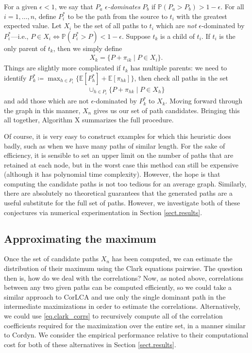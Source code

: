 \documentclass[12pt]{article}
\def\P{\mathbb{P}}
\def\E{\mathbb{E}}
\begin{document}
For a given $\epsilon < 1$, we say that $P_a$ {\em $\epsilon$-dominates} $P_b$ if $\P(P_a > P_b) > 1 - \epsilon$. For all $i = 1, \dots, n$, define $P_i^*$ to be the path from the source to $t_i$ with the greatest expected value. Let $X_i$ be the set of all paths to $t_i$ which are {\em not} $\epsilon$-dominated by $P_i^*$---i.e., $P \in X_i \iff \P(P_i^* > P) < 1- \epsilon$. Suppose $t_k$ is a child of $t_i$. If $t_i$ is the only parent of $t_k$, then we simply define
\begin{align*}
  X_k = \{P + \pi_{ik} \mid P \in X_i\}.
\end{align*}
Things are slightly more complicated if $t_k$ has multiple parents: we need to identify $P_k^* \coloneqq \max_{h \in P_i} \{ \E[P_h^*] + \E[\pi_{hk}] \}$, then check all paths in the set  
\begin{align*}
  \cup_{h \in P_i}\{P + \pi_{hk} \mid P \in X_h \}
\end{align*}
and add those which are not $\epsilon$-dominated by $P_k^*$ to $X_k$. Moving forward through the graph in this manner, $X_n$ gives us our set of path candidates. Bringing this all together, Algorithm X summarizes the full procedure.    
 
Of course, it is very easy to construct examples for which this heuristic does badly, such as when we have many paths of similar length. For the sake of efficiency, it is sensible to set an upper limit on the number of paths that are retained at each node, but in the worst case this method can still be expensive (although it has polynomial time complexity). However, the hope is that computing the candidate paths is not too tedious for an average graph. Similarly, there are absolutely no theoretical guarantees that the generated paths are a useful substitute for the full set of paths. However, we investigate both of these conjectures via numerical experimentation in Section \ref{sect.results}. 

\subsection{Approximating the maximum}
\label{subsect.approx_max}

Once the set of candidate paths $X_n$ has been computed, we can estimate the distribution of their maximum using the Clark equations pairwise. The question then is, how do we deal with the correlations? Now, as noted above, correlations between any two given paths can be computed efficiently, so we could take a similar approach to CorLCA and use only the single dominant path in the intermediate maximizations in order to estimate the correlations. Alternatively, we could use \eqref{eq.clark_corrs} to recursively compute all of the correlation coefficients required for the maximization over the entire set, in a manner similar to Cordyn. We consider the empirical performance relative to their computational cost for both of these alternatives in Section \ref{sect.results}.  
\end{document}
